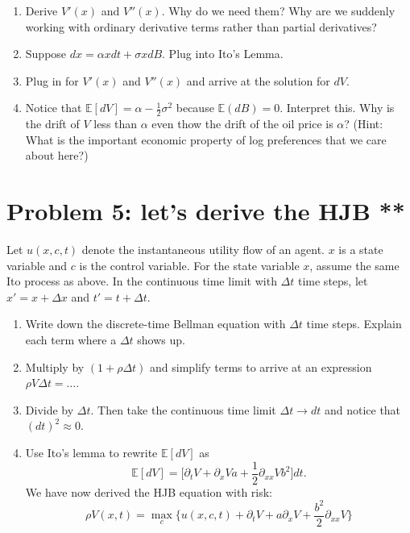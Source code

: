 \documentclass[11pt]{extarticle}
\theoremstyle{plain}
\theoremstyle{definition}
\begin{document}
\begin{enumerate}
\item Derive $V'(x)$ and $V''(x)$. Why do we need them? Why are we suddenly working with ordinary derivative terms rather than partial derivatives? 

\item Suppose $dx = \alpha x dt + \sigma x dB$. Plug into Ito's Lemma.

\item Plug in for $V'(x)$ and $V''(x)$ and arrive at the solution for $dV$. 

\item Notice that $\mathbb E[ dV ] = \alpha - \frac{1}{2} \sigma^2$ because $\mathbb E (dB) = 0$. Interpret this. Why is the drift of $V$ less than $\alpha$ even thow the drift of the oil price is $\alpha$? (Hint: What is the important economic property of log preferences that we care about here?)

\end{enumerate}





\vspace{10mm}
\section*{Problem 5: let's derive the HJB **}

Let $u(x, c, t)$ denote the instantaneous utility flow of an agent. $x$ is a state variable and $c$ is the control variable. For the state variable $x$, assume the same Ito process as above. In the continuous time limit with $\Delta t$ time steps, let $x' = x + \Delta x$ and $t' = t + \Delta t$.

\begin{enumerate}
\item Write down the discrete-time Bellman equation with $\Delta t$ time steps. Explain each term where a $\Delta t$ shows up. 

\item Multiply by $(1 + \rho \Delta t)$ and simplify terms to arrive at an expression $\rho V \Delta t = \ldots$. 

\item Divide by $\Delta t$. Then take the continuous time limit $\Delta t \to dt$ and notice that $(dt)^2 \approx 0$. 

\item Use Ito's lemma to rewrite $\mathbb E[dV]$ as 
\begin{equation*}
	\mathbb E[dV] = \bigg[ \partial_t V + \partial_x V a + \frac{1}{2} \partial_{xx} V b^2 \bigg] dt.
\end{equation*}
We have now derived the HJB equation with risk:
\begin{equation*}
		\rho V(x, t) = \max_c \bigg\{ u(x, c, t) + \partial_t V + a \partial_x V + \frac{b^2}{2} \partial_{xx} V \bigg\}
\end{equation*}

\end{enumerate}
\end{document}
